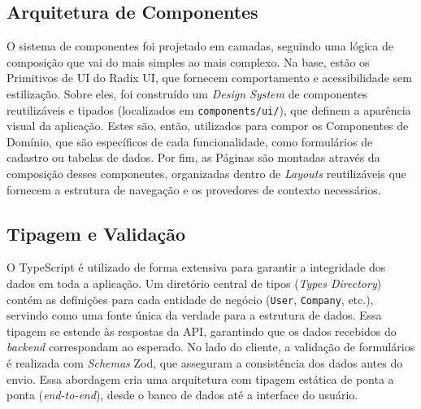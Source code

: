 \subsection{Arquitetura de Componentes}

O sistema de componentes foi projetado em camadas, seguindo uma lógica de composição que vai do mais simples ao mais complexo. Na base, estão os Primitivos de UI do Radix UI, que fornecem comportamento e acessibilidade sem estilização. Sobre eles, foi construído um \textit{Design System} de componentes reutilizáveis e tipados (localizados em \texttt{components/ui/}), que definem a aparência visual da aplicação. Estes são, então, utilizados para compor os Componentes de Domínio, que são específicos de cada funcionalidade, como formulários de cadastro ou tabelas de dados. Por fim, as Páginas são montadas através da composição desses componentes, organizadas dentro de \textit{Layouts} reutilizáveis que fornecem a estrutura de navegação e os provedores de contexto necessários.


\subsection{Tipagem e Validação}

O TypeScript é utilizado de forma extensiva para garantir a integridade dos dados em toda a aplicação. Um diretório central de tipos (\textit{Types Directory}) contém as definições para cada entidade de negócio (\texttt{User}, \texttt{Company}, etc.), servindo como uma fonte única da verdade para a estrutura de dados. Essa tipagem se estende às respostas da API, garantindo que os dados recebidos do \textit{backend} correspondam ao esperado. No lado do cliente, a validação de formulários é realizada com \textit{Schemas} Zod, que asseguram a consistência dos dados antes do envio. Essa abordagem cria uma arquitetura com tipagem estática de ponta a ponta (\textit{end-to-end}), desde o banco de dados até a interface do usuário.

